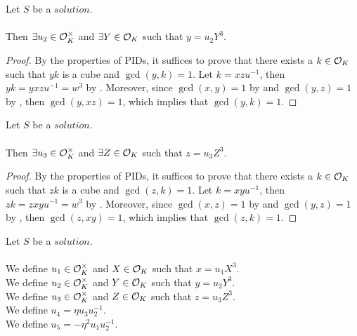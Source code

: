 \begin{lemma}
    \label{lmm:y_eq_unit_mul_cube}
    \leanok
    Let $S$ be a $solution$.\\\\
    Then $\exists u_2 \in \mathcal{O}^\times_K$ and $\exists Y \in \mathcal{O}_K$
    such that $y = u_2 Y^3$.
\end{lemma}
\begin{proof}
    \leanok
    By the properties of PIDs, it suffices to prove that there exists a $k\in \mathcal{O}_K$ such that
    $yk$ is a cube and $\gcd(y,k)=1$.
    Let $k = xzu^{-1}$, then $yk = y x z u^{-1} = w^3$ by .
    Moreover, since $\gcd(x,y)=1$ by  and $\gcd(y,z)=1$ by ,
    then $\gcd(y,xz)=1$, which implies that $\gcd(y,k)=1$.
\end{proof}

\begin{lemma}
    \label{lmm:z_eq_unit_mul_cube}
    \leanok
    Let $S$ be a $solution$.\\\\
    Then $\exists u_3 \in \mathcal{O}^\times_K$ and $\exists Z \in \mathcal{O}_K$
    such that $z = u_3  Z^3$.
\end{lemma}
\begin{proof}
    \leanok
    By the properties of PIDs, it suffices to prove that there exists a $k\in \mathcal{O}_K$ such that
    $zk$ is a cube and $\gcd(z,k)=1$.
    Let $k = xyu^{-1}$, then $zk = z x y u^{-1} = w^3$ by .
    Moreover, since $\gcd(x,z)=1$ by  and $\gcd(y,z)=1$ by ,
    then $\gcd(z,xy)=1$, which implies that $\gcd(z,k)=1$.
\end{proof}

\begin{definition}[$u_1,u_2,u_3,u_4,u_5,X,Y,Z$]
    \label{def:Solution_u1_u2_u3_u4_u5_X_Y_Z}
    \leanok
    Let $S$ be a $solution$.\\\\
    We define $u_1 \in \mathcal{O}^\times_K$ and $X \in \mathcal{O}_K$
    such that $x = u_1 X^3$.\\
    We define $u_2 \in \mathcal{O}^\times_K$ and $Y \in \mathcal{O}_K$
    such that $y = u_2 Y^3$.\\
    We define $u_3 \in \mathcal{O}^\times_K$ and $Z \in \mathcal{O}_K$
    such that $z = u_3 Z^3$.\\
    We define $u_4 = \eta u_3 u_2^{-1}$.\\
    We define $u_5 = -\eta^2 u_1 u_2^{-1}$.\\
\end{definition}

